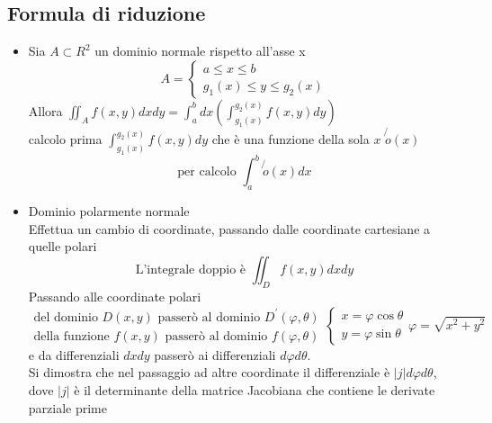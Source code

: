 \documentclass{book}
\newcommand{\abs}[1]{\lvert#1\rvert}
\begin{document}
\subsection{Formula di riduzione}
\begin{itemize}
\item Sia $A\subset R^2$ un dominio normale rispetto all'asse x
  \begin{equation*}
    A=\begin{cases}
        a\leq x\leq b\\
        g_1(x)\leq y\leq g_2(x)
      \end{cases}
  \end{equation*}
    Allora $\iint_A f(x,y) dxdy=\int_a^bdx \left(\int_{g_1(x)}^{g_2(x)}f(x,y)dy\right)$\\
    calcolo prima $\int_{g_1(x)}^{g_2(x)}f(x,y)dy$ che è una funzione della sola $x$ $\not{o}(x)$
    \begin{equation*}
      \text{per calcolo } \int^b_a \not{o} (x) dx
    \end{equation*}
  \item Dominio polarmente normale\\
    Effettua un cambio di coordinate, passando dalle coordinate cartesiane a quelle polari
    \begin{equation*}
      \text{L'integrale doppio è } \iint_Df(x,y)dxdy
    \end{equation*}
    Passando alle coordinate polari
    \begin{equation*}
      \begin{matrix}
        \text{del dominio } D(x,y) \text{ passerò al dominio } D^\prime (\varphi, \theta) \\
        \text{della funzione } f(x,y) \text{ passerò al dominio } f (\varphi, \theta)
      \end{matrix} \begin{cases}
                       x=\varphi\cos\theta\\
                     y=\varphi\sin\theta
                   \end{cases}
                   \varphi=\sqrt{x^2+y^2} 
   \end{equation*}
   e da differenziali $dxdy$ passerò ai differenziali $d\varphi d\theta$. \\
   Si dimostra che nel passaggio ad altre coordinate il differenziale è $\abs{j} d\varphi d\theta$,
   dove $\abs j$ è il determinante della {\color{red} matrice Jacobiana} che contiene le derivate
   parziale prime
   \begin{equation}

\end{equation}
\end{itemize}
\end{document}
